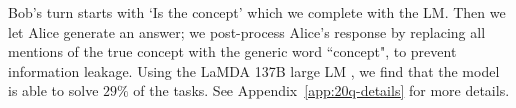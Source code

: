 

Bob's turn starts with `Is the concept' which we complete with the LM. Then we let Alice generate an answer;
we post-process Alice's response
by replacing all mentions of the 
true concept with the generic  word ``concept", to prevent information leakage. 
Using the LaMDA 137B large LM \citep{lamda},
we find that the model is able to solve $29\%$ of the tasks. %
See Appendix~\ref{app:20q-details} for more details.
